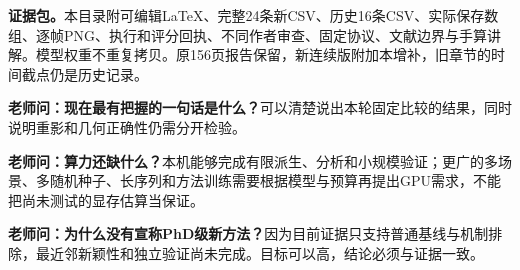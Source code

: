 \documentclass[UTF8,10pt,a4paper]{ctexart}
\begin{document}
\textbf{证据包。}本目录附可编辑LaTeX、完整24条新CSV、历史16条CSV、实际保存数组、逐帧PNG、执行和评分回执、不同作者审查、固定协议、文献边界与手算讲解。模型权重不重复拷贝。原156页报告保留，新连续版附加本增补，旧章节的时间截点仍是历史记录。

\textbf{老师问：现在最有把握的一句话是什么？}可以清楚说出本轮固定比较的结果，同时说明重影和几何正确性仍需分开检验。

\textbf{老师问：算力还缺什么？}本机能够完成有限派生、分析和小规模验证；更广的多场景、多随机种子、长序列和方法训练需要根据模型与预算再提出GPU需求，不能把尚未测试的显存估算当保证。

\textbf{老师问：为什么没有宣称PhD级新方法？}因为目前证据只支持普通基线与机制排除，最近邻新颖性和独立验证尚未完成。目标可以高，结论必须与证据一致。
\end{document}
